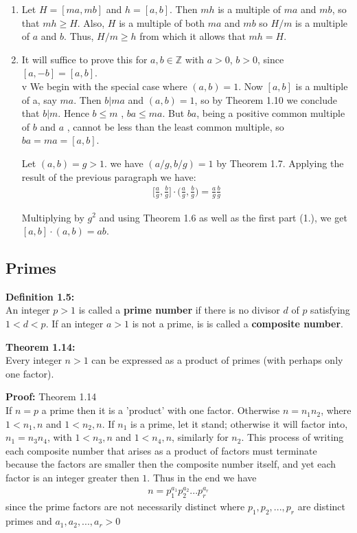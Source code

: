 \documentclass[a4paper]{article}
\begin{document}
\begin{enumerate}
\item Let $H=[ma,mb]$ and $h=[a,b]$. Then $mh$ is a multiple of $ma$ and $mb$, so that $mh\geq H$. Also, $H$ is a multiple of both $ma$ and $mb$ so $H/m$ is a multiple of $a$ and $b$. Thus, $H/m \geq h$ from which it allows that $mh=H$.
\item It will suffice to prove this for $a,b\in\mathbb{Z}$ with $a>0$, $b>0$, since $[a,-b]=[a,b]$.\\v
We begin with the special case where $(a,b)=1$. Now $[a,b]$ is a multiple of a, say $ma$. Then $b|ma$ and $(a,b)=1$, so by Theorem 1.10 we conclude that $b|m$. Hence $b \leq m$ , $ba\leq ma$. But $ba$, being a positive common multiple of $b$ and $a$ , cannot be less than the least common multiple, so $ba=ma=[a,b]$.

Let $(a,b)=g>1$. we have $(a/g,b/g)=1$ by Theorem 1.7. Applying the result of the previous paragraph we have:
\begin{align}
\bigg[\frac{a}{g},\frac{b}{g}\bigg]\cdot\bigg(\frac{a}{g},\frac{b}{g}\bigg)=\frac{a}{g}\frac{b}{g}
\end{align}

Multiplying by $g^2$ and using Theorem 1.6 as well as the first part (1.), we get $[a,b]\cdot(a,b)=ab$.
\end{enumerate}


\subsection{Primes}

\textbf{Definition 1.5:}\\
An integer $p>1$ is called a \textbf{prime number} if there is no divisor $d$ of $p$ satisfying $1<d<p$. If an integer $a>1$ is not a prime, is is called a \textbf{composite number}.

\textbf{Theorem 1.14:}\\
Every integer $n>1$ can be expressed as a product of primes (with perhaps only one factor).

\textbf{Proof:} Theorem 1.14\\
If $n=p$ a prime then it is a 'product' with one factor.
Otherwise $n=n_1n_2$, where $1<n_1,n$ and $1<n_2,n$. If $n_1$ is a prime, let it stand; otherwise it will factor into, $n_1=n_3n_4$, with $1<n_3,n$ and $1<n_4,n$, similarly for $n_2$. This process of writing each composite number that arises as a product of factors must terminate because the factors are smaller then the composite number itself, and yet each factor is an integer greater then $1$. Thus in the end we have
\begin{align*}
    n = p_1^{a_1}p_2^{a_2}...p_r^{a_r}
\end{align*}
since the prime factors are not necessarily distinct where $p_1,p_2,...,p_r$ are distinct primes and $a_1,a_2,...,a_r>0$
\end{document}

